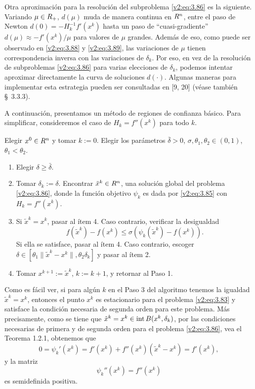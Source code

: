 Otra aproximación para la resolución del subproblema \eqref{v2:eq:3.86} es la siguiente. Variando $\mu \in R_+$, $d(\mu)$ muda de manera continua en $R^n$, entre el paso de Newton $d(0) = -H_k^{-1}f'(x^k)$ hasta un paso de ``cuasi-gradiente'' $d(\mu) \approx -f'(x^k)/\mu$ para valores de $\mu$ grandes. Además de eso, como puede ser observado en \eqref{v2:eq:3.88} y \eqref{v2:eq:3.89}, las variaciones de $\mu$ tienen correspondencia inversa con las variaciones de $\delta_k$. Por eso, en vez de la resolución de subproblemas \eqref{v2:eq:3.86} para varias elecciones de $\delta_k$, podemos intentar aproximar directamente la curva de soluciones $d(\cdot)$. Algunas maneras para implementar esta estrategia pueden ser consultadas en [9, 20] (véase también \S~3.3.3).

A continuación, presentamos un método de regiones de confianza básico. Para simplificar, consideremos el caso de $H_k = f''(x^k)$ para todo $k$.

\begin{algorithm}
Elegir $x^0 \in R^n$ y tomar $k:=0$. Elegir los parámetros $\bar{\delta} > 0$, $\sigma, \theta_1, \theta_2 \in (0, 1)$, $\theta_1 < \theta_2$.
\begin{enumerate}
    \item Elegir $\delta \ge \bar{\delta}$.
    \item Tomar $\delta_k := \delta$. Encontrar $\tilde{x}^k \in R^n$, una solución global del problema \eqref{v2:eq:3.86}, donde la función objetivo $\psi_k$ es dada por \eqref{v2:eq:3.85} con $H_k = f''(x^k)$.
    \item Si $\tilde{x}^k = x^k$, pasar al ítem 4. Caso contrario, verificar la desigualdad
    \begin{equation}
        f(\tilde{x}^k) - f(x^k) \le \sigma (\psi_k(\tilde{x}^k) - f(x^k)).
        \label{v2:eq:3.90}
    \end{equation}
    Si ella se satisface, pasar al ítem 4. Caso contrario, escoger $\delta \in [\theta_1 \|\tilde{x}^k - x^k\|, \theta_2 \delta_k]$ y pasar al ítem 2.
    \item Tomar $x^{k+1} := \tilde{x}^k$, $k := k + 1$, y retornar al Paso 1.
\end{enumerate}
\end{algorithm}
Como es fácil ver, si para algún $k$ en el Paso 3 del algoritmo tenemos la igualdad $\tilde{x}^k = x^k$, entonces el punto $x^k$ es estacionario para el problema \eqref{v2:eq:3.83} y satisface la condición necesaria de segunda orden para este problema. Más precisamente, como se tiene que $\tilde{x}^k = x^k \in \operatorname{\operatorname{int}} B(x^k, \delta_k)$, por las condiciones necesarias de primera y de segunda orden para el problema \eqref{v2:eq:3.86}, vea el Teorema 1.2.1, obtenemos que
\[
    0 = \psi_k'(x^k) = f'(x^k) + f''(x^k)(\tilde{x}^k - x^k) = f'(x^k),
\]
y la matriz
\[
    \psi_k''(x^k) = f''(x^k)
\]
es semidefinida positiva.

